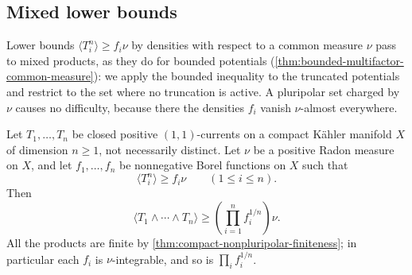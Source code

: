 \subsection{Mixed lower bounds}
\label{sec:nonpluripolar-common-measure-mixed}
Lower bounds $\langle T_i^n\rangle\geq f_i\nu$ by densities with respect to a common measure $\nu$ pass to mixed products, as they do for bounded potentials (\cref{thm:bounded-multifactor-common-measure}): we apply the bounded inequality to the truncated potentials and restrict to the set where no truncation is active. A pluripolar set charged by $\nu$ causes no difficulty, because there the densities $f_i$ vanish $\nu$-almost everywhere.

\begin{proposition}\label{prop:nonpluripolar-multifactor-common-measure}
Let $T_1,\ldots,T_n$ be closed positive $(1,1)$-currents on a compact K\"ahler manifold $X$ of dimension $n\geq1$, not necessarily distinct. Let $\nu$ be a positive Radon measure on $X$, and let $f_1,\ldots,f_n$ be nonnegative Borel functions on $X$ such that
\[
 \langle T_i^n\rangle\geq f_i\nu\qquad(1\leq i\leq n).
\]
Then
\[
 \langle T_1\wedge\cdots\wedge T_n\rangle
                    \geq\left(\prod_{i=1}^n f_i^{1/n}\right)\nu.
\]
All the products are finite by \cref{thm:compact-nonpluripolar-finiteness}; in particular each $f_i$ is $\nu$-integrable, and so is $\prod_if_i^{1/n}$.
\end{proposition}
